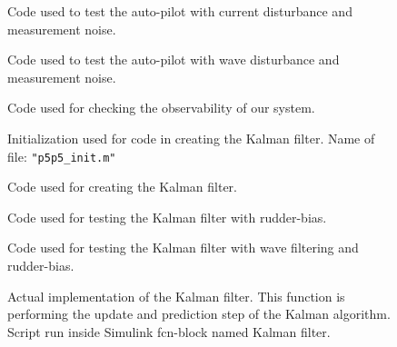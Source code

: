 \begin{figure}[!htb]
    \centering
    \caption{Code used to test the auto-pilot with current disturbance and measurement noise.}
    
    \label{fig:p5p3c}
\end{figure}

\begin{figure}[!htb]
    \centering
    \caption{Code used to test the auto-pilot with wave disturbance and measurement noise.}
    
    \label{fig:p5p3d}
\end{figure}

\begin{figure}[!htb]
    \centering
    \caption{Code used for checking the observability of our system.}
    
    \label{fig:p5p4}
\end{figure}

\begin{figure}[!htb]
    \centering
    \caption{Initialization used for code in creating the Kalman filter. Name of file: \texttt{"p5p5\_init.m"}}
    
    \label{fig:p5p5_init}
\end{figure}

\begin{figure}[!htb]
    \centering
    \caption{Code used for creating the Kalman filter.}
    
    \label{fig:p5p5c}
\end{figure}

\begin{figure}[!htb]
    \centering
    \caption{Code used for testing the Kalman filter with rudder-bias.}
    
    \label{fig:p5p5d}
\end{figure}

\begin{figure}[!htb]
    \centering
    \caption{Code used for testing the Kalman filter with wave filtering and rudder-bias.}
    
    \label{fig:p5p5e}
\end{figure}

\begin{figure}[!htb]
    \centering
    \caption{Actual implementation of the Kalman filter. This function is performing the update and prediction step of the Kalman algorithm. Script run inside Simulink fcn-block named Kalman filter.}
    
    \label{fig:kalman_filter}
\end{figure}

